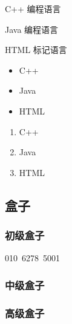 \documentclass[UTF8]{article}
\begin{document}
\begin{inparadesc}
	\item[C++] 编程语言
	\item[Java] 编程语言
	\item[HTML] 标记语言
\end{inparadesc}

\renewcommand{\labelitemi}{-}
\renewcommand{\theenumi}{\alph{enumi}}
\begin{itemize}
	\item C++
	\item Java
	\item HTML
\end{itemize}

\begin{enumerate}
	\item C++
	\item Java
	\item HTML
\end{enumerate}

\subsection{盒子}
\subsubsection{初级盒子}
\mbox{010 6278 5001}%
\subsubsection{中级盒子}

\subsubsection{高级盒子}
\hfill
{}
\end{document}

